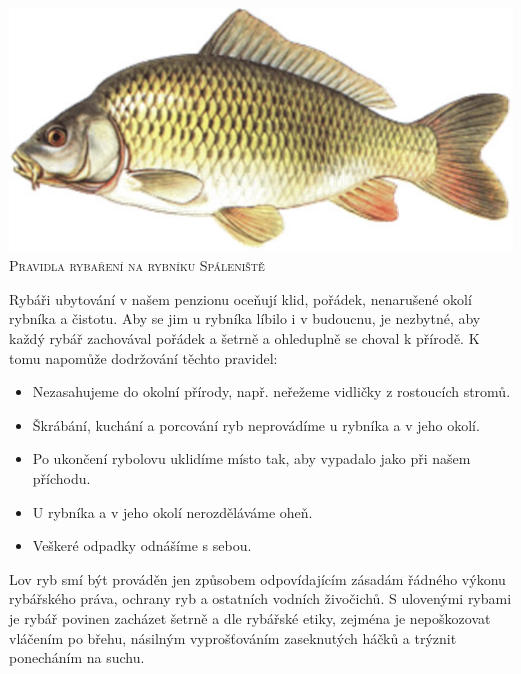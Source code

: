 \documentclass[egregdoesnotlikesansseriftitles,a4paper,fontsize=12pt]{scrartcl}
\begin{document}
\begin{center}
\includegraphics[width=.5\linewidth]{kapr-obecny-kresba.jpg}\\[1em]
\huge{\textsc{Pravidla rybaření na rybníku Spáleniště}}\\
\end{center}
\vspace{6em}

Rybáři ubytování v našem penzionu oceňují klid, pořádek, nenarušené okolí
rybníka a čistotu. Aby se jim u rybníka líbilo i v budoucnu, je nezbytné, aby
každý rybář zachovával pořádek a šetrně a ohleduplně se choval k přírodě. K tomu napomůže dodržování těchto pravidel:
\begin{itemize}
\item Nezasahujeme do okolní přírody, např. neřežeme
vidličky z rostoucích
stromů.
\item Škrábání, kuchání a porcování ryb neprovádíme u rybníka a v jeho okolí.
\item Po ukončení rybolovu uklidíme místo tak, aby vypadalo jako při našem příchodu.
\item U rybníka a v jeho okolí nerozděláváme oheň.
\item Veškeré odpadky odnášíme s sebou.
\end{itemize}

Lov ryb smí být prováděn jen způsobem odpovídajícím zásadám řádného výkonu
rybářského práva, ochrany ryb a ostatních vodních živočichů. S ulovenými rybami
je rybář povinen zacházet šetrně a dle rybářské etiky, zejména je nepoškozovat
vláčením po břehu, násilným vyprošťováním zaseknutých háčků a trýznit
ponecháním na suchu.
\pagebreak
\end{document}
